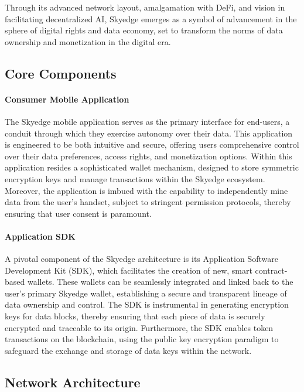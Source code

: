 \documentclass{article}
\begin{document}
Through its advanced network layout, amalgamation with DeFi, and vision in facilitating decentralized AI, Skyedge emerges as a symbol of advancement in the sphere of digital rights and data economy, set to transform the norms of data ownership and monetization in the digital era.


\subsection{Core Components}

\paragraph{Consumer Mobile Application} The Skyedge mobile application serves as the primary interface for end-users, a conduit through which they exercise autonomy over their data. This application is engineered to be both intuitive and secure, offering users comprehensive control over their data preferences, access rights, and monetization options. Within this application resides a sophisticated wallet mechanism, designed to store symmetric encryption keys and manage transactions within the Skyedge ecosystem. Moreover, the application is imbued with the capability to independently mine data from the user's handset, subject to stringent permission protocols, thereby ensuring that user consent is paramount.

\paragraph{Application SDK} A pivotal component of the Skyedge architecture is its Application Software Development Kit (SDK), which facilitates the creation of new, smart contract-based wallets. These wallets can be seamlessly integrated and linked back to the user's primary Skyedge wallet, establishing a secure and transparent lineage of data ownership and control. The SDK is instrumental in generating encryption keys for data blocks, thereby ensuring that each piece of data is securely encrypted and traceable to its origin. Furthermore, the SDK enables token transactions on the blockchain, using the public key encryption paradigm to safeguard the exchange and storage of data keys within the network.

\subsection{Network Architecture}
\end{document}
